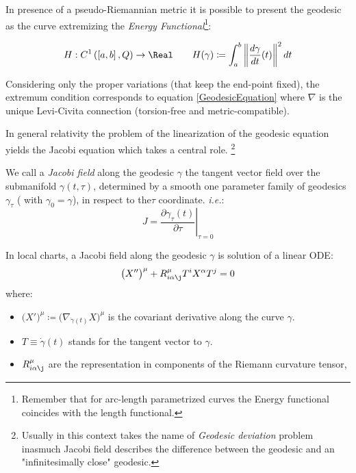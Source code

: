 \documentclass[Main]{subfiles}
\begin{document}
	\vspace{4mm}
	In presence of a pseudo-Riemannian metric it is possible to present the geodesic %
	as the curve extremizing the \emph{Energy Functional}\footnote{Remember that for arc-length parametrized curves the Energy functional coincides with the length functional.\cite[Lemma $1.4.2$ ]{Jost2005}}:
	\begin{definition}
  	\begin{equation}\label{EnergyFunctional}
  		H: C^1\left(\left[a,b\right],Q\right) \rightarrow \Real \qquad
 		H(\gamma) \coloneqq \int_a^b \left\Vert \frac{d \gamma}{dt} (t)\right\Vert^2 dt
 	\end{equation}
\end{definition} 	
	Considering only the proper variations (that keep the end-point fixed), the extremum condition corresponds to equation \ref{GeodesicEquation} where $\nabla$ is the unique Levi-Civita connection (torsion-free and metric-compatible).

	\vspace{4mm}
	In general relativity the problem of the 
	linearization of the geodesic equation yields the Jacobi equation which takes
	 a central role. \footnote{Usually in this context takes the name of \emph{Geodesic deviation} problem\cite[pag. 46]{Wald1984} inasmuch Jacobi field describes the difference between the geodesic and an "infinitesimally close" geodesic.}
	
	\begin{definition}
	We call a \emph{Jacobi field} along the geodesic $\gamma$ the tangent vector field over the submanifold $\gamma(t,\tau)$, determined by  a smooth one parameter family of geodesics$ \gamma_\tau$ ( with $\gamma_0=\gamma$), in respect to the$\tau$ coordinate. \textit{i.e.}:
	\begin{displaymath}
	 J = \left. \frac{\partial \gamma_\tau (t)}{\partial \tau}\right\rvert_{\tau=0}
	\end{displaymath}
	\end{definition}
	
		In local charts, a Jacobi field along the geodesic $\gamma$ is solution of a linear ODE:
		\begin{equation}\label{JacobiEquationComponents}
			\big( X''\big)^\mu + R^\mu_{i \alpha \j} T^i X^\alpha T^j =0
		\end{equation}
		where:
		\begin{itemize}
			\item $\big(X'\big)^\mu \coloneqq \big( \nabla_{\dot{\gamma}(t)} X\big)^\mu$ is the covariant derivative along the curve $\gamma$.
			\item $T \equiv \dot{\gamma}(t)$ stands for the tangent vector to $\gamma$.
			\item $R^\mu_{i \alpha \j}$ are the representation in components of the Riemann curvature tensor,
		\end{itemize}
\end{document}
